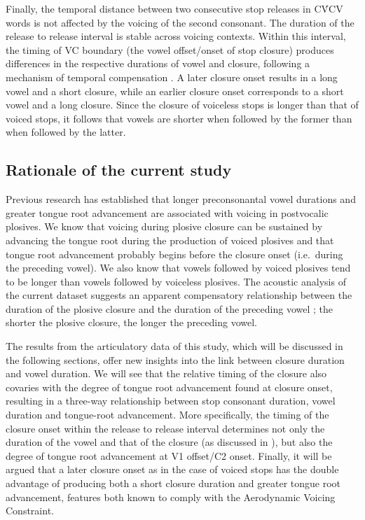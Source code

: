 \documentclass[preprint]{JASAnew}
\begin{document}
Finally, the temporal distance between two consecutive stop releases in
CV́CV words is not affected by the voicing of the second consonant. The
duration of the release to release interval is stable across voicing
contexts. Within this interval, the timing of VC boundary (the vowel
offset/onset of stop closure) produces differences in the respective
durations of vowel and closure, following a mechanism of temporal
compensation
\citep{lindblom1967, slis1969a, slis1969b, lehiste1970a, lehiste1970b}.
A later closure onset results in a long vowel and a short closure, while
an earlier closure onset corresponds to a short vowel and a long
closure. Since the closure of voiceless stops is longer than that of
voiced stops, it follows that vowels are shorter when followed by the
former than when followed by the latter.

\hypertarget{rationale-of-the-current-study}{%
\subsection{Rationale of the current
study}\label{rationale-of-the-current-study}}

Previous research has established that longer preconsonantal vowel
durations \citep{house1953, peterson1960, chen1970} and greater tongue
root advancement \citep{kent1969, perkell1969, westbury1983} are
associated with voicing in postvocalic plosives. We know that voicing
during plosive closure can be sustained by advancing the tongue root
during the production of voiced plosives and that tongue root
advancement probably begins before the closure onset (i.e.~during the
preceding vowel). We also know that vowels followed by voiced plosives
tend to be longer than vowels followed by voiceless plosives. The
acoustic analysis of the current dataset suggests an apparent
compensatory relationship between the duration of the plosive closure
and the duration of the preceding vowel \citep{coretta2018j}; the
shorter the plosive closure, the longer the preceding vowel.

The results from the articulatory data of this study, which will be
discussed in the following sections, offer new insights into the link
between closure duration and vowel duration. We will see that the
relative timing of the closure also covaries with the degree of tongue
root advancement found at closure onset, resulting in a three-way
relationship between stop consonant duration, vowel duration and
tongue-root advancement. More specifically, the timing of the closure
onset within the release to release interval determines not only the
duration of the vowel and that of the closure (as discussed in
\citealt{coretta2018j}), but also the degree of tongue root advancement
at V1 offset/C2 onset. Finally, it will be argued that a later closure
onset as in the case of voiced stops has the double advantage of
producing both a short closure duration and greater tongue root
advancement, features both known to comply with the Aerodynamic Voicing
Constraint.
\end{document}
